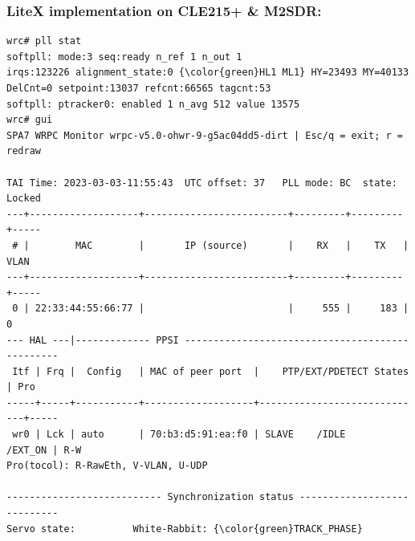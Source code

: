 \documentclass[compress,10pt,aspectratio=169]{beamer}
\begin{document}
\begin{frame}[fragile]\frametitle{LiteX implementation on CLE215+ \& M2SDR:\\
}

\vspace{.3cm}
\begin{minipage}[t]{1.05\linewidth}
\begin{minipage}{.66\linewidth}
{\scriptsize
\begin{Verbatim}[commandchars=\\\{\}]
wrc# pll stat
softpll: mode:3 seq:ready n_ref 1 n_out 1
irqs:123226 alignment_state:0 {\color{green}HL1 ML1} HY=23493 MY=40133 DelCnt=0 setpoint:13037 refcnt:66565 tagcnt:53
softpll: ptracker0: enabled 1 n_avg 512 value 13575
wrc# gui
SPA7 WRPC Monitor wrpc-v5.0-ohwr-9-g5ac04dd5-dirt | Esc/q = exit; r = redraw

TAI Time: 2023-03-03-11:55:43  UTC offset: 37   PLL mode: BC  state: Locked
---+-------------------+-------------------------+---------+---------+-----
 # |        MAC        |       IP (source)       |    RX   |    TX   | VLAN
---+-------------------+-------------------------+---------+---------+-----
 0 | 22:33:44:55:66:77 |                         |     555 |     183 |    0
--- HAL ---|------------- PPSI ------------------------------------------------
 Itf | Frq |  Config   | MAC of peer port  |    PTP/EXT/PDETECT States   | Pro 
-----+-----+-----------+-------------------+-----------------------------+-----
 wr0 | Lck | auto      | 70:b3:d5:91:ea:f0 | SLAVE    /IDLE      /EXT_ON | R-W 
Pro(tocol): R-RawEth, V-VLAN, U-UDP

--------------------------- Synchronization status ----------------------------
Servo state:          White-Rabbit: {\color{green}TRACK_PHASE}


\end{Verbatim}}
\end{minipage}
\end{minipage}
\end{frame}
\end{document}
